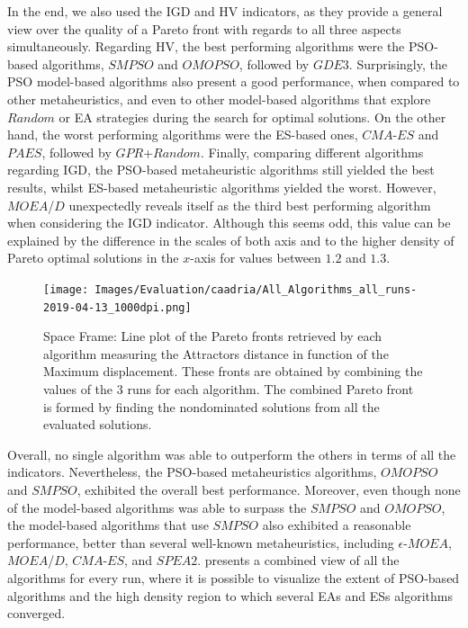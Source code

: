 In the end, we also used the \ac{IGD} and \ac{HV} indicators, as they provide a general view over the quality of a Pareto front with regards to all three aspects simultaneously. Regarding \ac{HV}, the best performing algorithms were the \ac{PSO}-based algorithms, $SMPSO$ and $OMOPSO$, followed by $GDE3$. Surprisingly, the \ac{PSO} model-based algorithms also present a good performance, when compared to other metaheuristics, and even to other model-based algorithms that explore $Random$ or \ac{EA} strategies during the search for optimal solutions. On the other hand, the worst performing algorithms were the \ac{ES}-based ones, $CMA$-$ES$ and $PAES$, followed by $GPR$+$Random$. Finally, comparing different algorithms regarding \ac{IGD}, the \ac{PSO}-based metaheuristic algorithms still yielded the best results, whilst \ac{ES}-based metaheuristic algorithms yielded the worst. However, $MOEA$/$D$ unexpectedly reveals itself as the third best performing algorithm when considering the \ac{IGD} indicator. Although this seems odd, this value can be explained by the difference in the scales of both axis and to the higher density of Pareto optimal solutions in the $x$-axis for values between $1.2$ and $1.3$.

\begin{figure}[htbp]
	\centering
	\texttt{[image: Images/Evaluation/caadria/All\_Algorithms\_all\_runs-2019-04-13\_1000dpi.png]}
	\caption[Space Frame: Pareto front plot]{Space Frame: Line plot of the Pareto fronts retrieved by each algorithm measuring the Attractors distance in function of the Maximum displacement. These fronts are obtained by combining the values of the $3$ runs for each algorithm. The combined Pareto front is formed by finding the nondominated solutions from all the evaluated solutions.}
	\label{fig:allruns}
\end{figure}

Overall, no single algorithm was able to outperform the others in terms of all the indicators. Nevertheless, the \ac{PSO}-based metaheuristics algorithms, $OMOPSO$ and $SMPSO$, exhibited the overall best performance. Moreover, even though none of the model-based algorithms was able to surpass the $SMPSO$ and $OMOPSO$, the model-based algorithms that use $SMPSO$ also exhibited a reasonable performance, better than several well-known metaheuristics, including $\epsilon$-$MOEA$, $MOEA$/$D$, $CMA$-$ES$, and $SPEA2$.  presents a combined view of all the algorithms for every run, where it is possible to visualize the extent of \ac{PSO}-based algorithms and the high density region to which several \acp{EA} and \acp{ES} algorithms converged.


